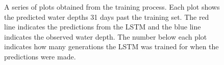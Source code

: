 \begin{figure}[ht]
    \caption{A series of plots obtained from the training process. Each plot shows the predicted water depths 31 days past the training set. The red line indicates the predictions from the LSTM and the blue line indicates the observed water depth. The number below each plot indicates how many generations the LSTM was trained for when the predictions were made.}
    \label{fig:Training}
\end{figure}